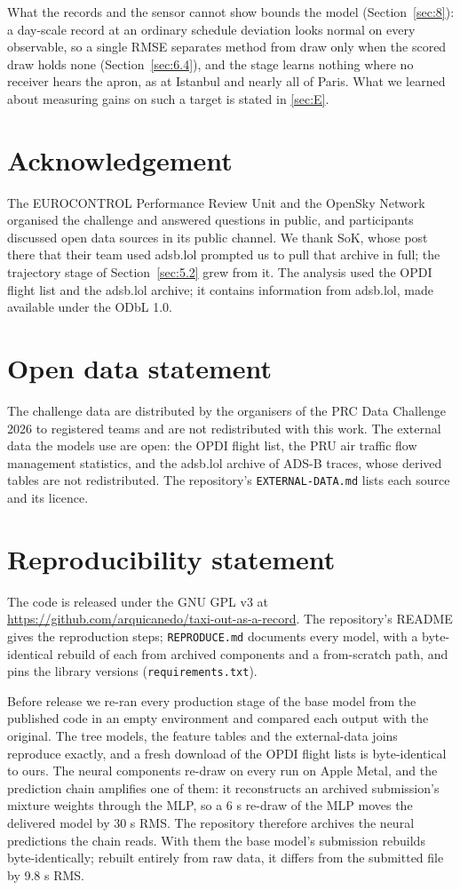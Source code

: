 \documentclass[
  manuscript=article,
  layout=preprint,
  year=2026,
  volume=x,
]{extra/joas}
\begin{document}
What the records and the sensor cannot show bounds the model (Section~\ref{sec:8}): a day-scale record at an ordinary schedule deviation looks normal on every observable, so a single RMSE separates method from draw only when the scored draw holds none (Section~\ref{sec:6.4}), and the stage learns nothing where no receiver hears the apron, as at Istanbul and nearly all of Paris. What we learned about measuring gains on such a target is stated in \ref{sec:E}.


\section*{Acknowledgement}
The EUROCONTROL Performance Review Unit and the OpenSky Network organised the challenge and answered questions in public, and participants discussed open data sources in its public channel. We thank SoK, whose post there that their team used adsb.lol prompted us to pull that archive in full; the trajectory stage of Section~\ref{sec:5.2} grew from it. The analysis used the OPDI flight list and the adsb.lol archive; it contains information from adsb.lol, made available under the ODbL 1.0.

\section*{Open data statement}
The challenge data are distributed by the organisers of the PRC Data Challenge 2026 to registered teams and are not
redistributed with this work. The external data the models use are open: the OPDI flight list, the PRU air traffic flow
management statistics, and the adsb.lol archive of ADS-B traces, whose derived tables are not redistributed. The repository's \texttt{EXTERNAL-DATA.md} lists each source and its
licence.

\section*{Reproducibility statement}
The code is released under the GNU GPL v3 at \url{https://github.com/arquicanedo/taxi-out-as-a-record}. The repository's README gives the reproduction steps; \texttt{REPRODUCE.md} documents every model, with a byte-identical rebuild of each from archived components and a from-scratch path, and pins the library versions (\texttt{requirements.txt}).

Before release we re-ran every production stage of the base model from the published code in an empty environment and compared each output with the original. The tree models, the feature tables and the external-data joins reproduce exactly, and a fresh download of the OPDI flight lists is byte-identical to ours. The neural components re-draw on every run on Apple Metal, and the prediction chain amplifies one of them: it reconstructs an archived submission's mixture weights through the MLP, so a 6 s re-draw of the MLP moves the delivered model by 30 s RMS. The repository therefore archives the neural predictions the chain reads. With them the base model's submission rebuilds byte-identically; rebuilt entirely from raw data, it differs from the submitted file by 9.8 s RMS.
\end{document}
